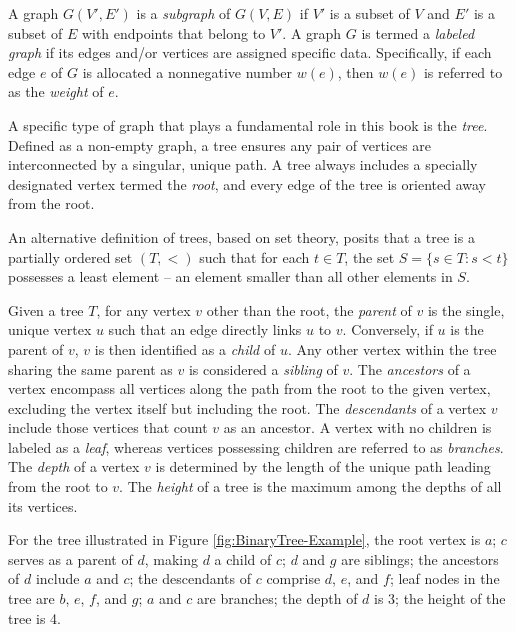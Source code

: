 A graph $G(V',E')$ is a \emph{subgraph} of $G(V,E)$ if $V'$ is a subset of $V$ and $E'$ is a subset of $E$ with endpoints that belong to $V'$. A graph $G$ is termed a \emph{labeled graph} if its edges and/or vertices are assigned specific data. Specifically, if each edge $e$ of $G$ is allocated a nonnegative number $w(e)$, then $w(e)$ is referred to as the \emph{weight} of $e$.

A specific type of graph that plays a fundamental role in this book is the \emph{tree}. Defined as a non-empty graph, a tree ensures any pair of vertices are interconnected by a singular, unique path. A tree always includes a specially designated vertex termed the \emph{root}, and every edge of the tree is oriented away from the root.

\begin{example}
An alternative definition of trees, based on set theory, posits that a tree is a partially ordered set $(T, <)$ such that for each $t \in T$, the set $S = \{ s \in T : s < t \}$ possesses a least element – an element smaller than all other elements in $S$.
\end{example}

Given a tree $T$, for any vertex $v$ other than the root, the \emph{parent} of $v$ is the single, unique vertex $u$ such that an edge directly links $u$ to $v$. Conversely, if $u$ is the parent of $v$, $v$ is then identified as a \emph{child} of $u$. Any other vertex within the tree sharing the same parent as $v$ is considered a \emph{sibling} of $v$. The \emph{ancestors} of a vertex encompass all vertices along the path from the root to the given vertex, excluding the vertex itself but including the root. The \emph{descendants} of a vertex $v$ include those vertices that count $v$ as an ancestor. A vertex with no children is labeled as a \emph{leaf}, whereas vertices possessing children are referred to as \emph{branches}. The \emph{depth} of a vertex $v$ is determined by the length of the unique path leading from the root to $v$. The \emph{height} of a tree is the maximum among the depths of all its vertices.

\begin{example}
For the tree illustrated in Figure \ref{fig:BinaryTree-Example}, the root vertex is $a$; $c$ serves as a parent of $d$, making $d$ a child of $c$; $d$ and $g$ are siblings; the ancestors of $d$ include $a$ and $c$; the descendants of $c$ comprise $d$, $e$, and $f$; leaf nodes in the tree are $b$, $e$, $f$, and $g$; $a$ and $c$ are branches; the depth of $d$ is 3; the height of the tree is 4.
\end{example}

